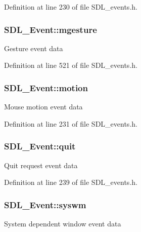Definition at line 230 of file S\+D\+L\+\_\+events.\+h.

\hypertarget{unionSDL__Event_ac19b3c6a6b5181a51eb4fbe2cbe726a9}{
\subsubsection[{mgesture}]{ S\+D\+L\+\_\+\+Event\+::mgesture}}\label{unionSDL__Event_ac19b3c6a6b5181a51eb4fbe2cbe726a9}
Gesture event data 

Definition at line 521 of file S\+D\+L\+\_\+events.\+h.

\hypertarget{unionSDL__Event_ac3c89e190faacbe84280cd539453bab6}{
\subsubsection[{motion}]{ S\+D\+L\+\_\+\+Event\+::motion}}\label{unionSDL__Event_ac3c89e190faacbe84280cd539453bab6}
Mouse motion event data 

Definition at line 231 of file S\+D\+L\+\_\+events.\+h.

\hypertarget{unionSDL__Event_a102a3008afe67a1c02ae7504e232dcef}{
\subsubsection[{quit}]{ S\+D\+L\+\_\+\+Event\+::quit}}\label{unionSDL__Event_a102a3008afe67a1c02ae7504e232dcef}
Quit request event data 

Definition at line 239 of file S\+D\+L\+\_\+events.\+h.

\hypertarget{unionSDL__Event_ab3b2eaf5348d4c50a51b1f297fdef537}{
\subsubsection[{syswm}]{ S\+D\+L\+\_\+\+Event\+::syswm}}\label{unionSDL__Event_ab3b2eaf5348d4c50a51b1f297fdef537}
System dependent window event data 

